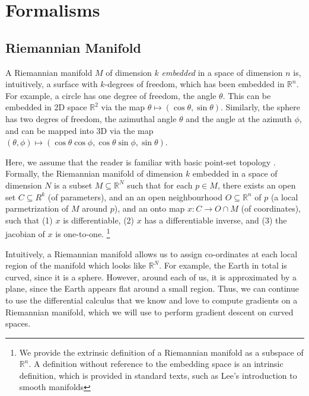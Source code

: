 \documentclass[11pt]{book}
\newcommand{\R}{\ensuremath{\mathbb R}}
\begin{document}

\section{Formalisms}



\subsection{Riemannian Manifold}

A Riemannian manifold $M$ of dimension $k$ \emph{embedded} in a space of
dimension $n$ is, intuitively, a surface with $k$-degrees of freedom, which has
been embedded in $\R^n$.  For example, a circle has one degree of freedom, the angle $\theta$.
This can be embedded in 2D space $\mathbb R^2$ via the map $\theta \mapsto (\cos \theta, \sin \theta)$.
Similarly, the sphere has two degres of freedom, the azimuthal angle $\theta$ and the angle
at the azimuth $\phi$, and can be mapped into 3D via the map
$(\theta, \phi) \mapsto (\cos \theta \cos \phi, \cos \theta \sin \phi, \sin \theta)$.

Here, we assume that the reader is familiar with basic point-set topology \cite{munkres2014topology}.
Formally, the Riemannian manifold of dimension $k$ embedded in a space of dimension $N$
is a subset $M \subseteq \R^N$ such that for each $p \in M$,
there exists an open set $C \subseteq R^k$ (of parameters), and an
an open neighbourhood $O \subseteq \mathbb R^n$ of $p$ (a local parmetrization of $M$ around $p$),
and an onto map $x: C \rightarrow O \cap M$ (of coordinates), such that (1) $x$ is differentiable,
(2) $x$ has a differentiable inverse, and (3) the jacobian of $x$ is one-to-one.
\footnote{We provide the extrinsic definition of a Riemannian manifold as a
subspace of $\mathbb R^n$.  A definition without reference to the embedding
space is an intrinsic definition, which is provided in standard texts, such as
Lee's introduction to smooth manifolds}

Intuitively, a Riemannian manifold allows us to assign co-ordinates at each
local region of the manifold which looks like $\R^N$. For example, the Earth in
total is curved, since it is a sphere. However, around each of us, it is
approximated by a plane, since the Earth appears flat around a small region.
Thus, we can continue to use the differential calculus that we know and love to
compute gradients on a Riemannian manifold, which we will use to perform gradient
descent on curved spaces.
\end{document}
